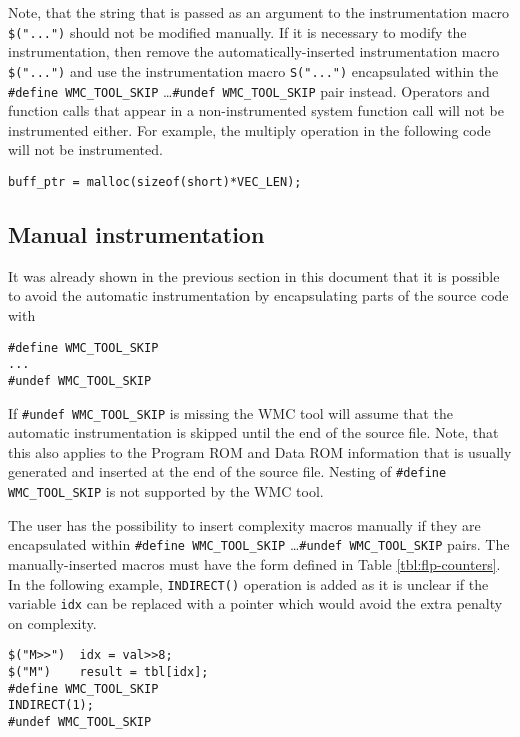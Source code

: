 Note, that the string that is passed as an argument to the instrumentation macro \verb|$("...")| should not be modified manually. If it is necessary to modify the instrumentation, then remove the automatically-inserted instrumentation macro \verb|$("...")| and use the instrumentation macro \verb|S("...")| encapsulated within the \verb|#define WMC_TOOL_SKIP| \ldots \verb|#undef WMC_TOOL_SKIP| pair instead. Operators and function calls that appear in a non-instrumented system function call will not be instrumented either. For example, the multiply operation in the following code will not be instrumented.

\begin{Verbatim}[fontsize=\small]
buff_ptr = malloc(sizeof(short)*VEC_LEN);
\end{Verbatim}

\subsection{Manual instrumentation}

It was already shown in the previous section in this document that it is possible to avoid the automatic instrumentation by encapsulating parts of the source code with

\begin{Verbatim}[fontsize=\small]
#define WMC_TOOL_SKIP
...
#undef WMC_TOOL_SKIP
\end{Verbatim}

If \verb|#undef WMC_TOOL_SKIP| is missing the WMC tool will assume that the automatic instrumentation is skipped until the end of the source file. Note, that this also applies to the Program ROM and Data ROM information that is usually generated and inserted at the end of the source file. Nesting of \verb|#define WMC_TOOL_SKIP| is not supported by the WMC tool.

The user has the possibility to insert complexity macros manually if they are encapsulated within \verb|#define WMC_TOOL_SKIP| \ldots \verb|#undef WMC_TOOL_SKIP| pairs. The manually-inserted macros must have the form defined in Table \ref{tbl:flp-counters}. In the following example, \verb|INDIRECT()| operation is added as it is unclear if the variable \verb|idx| can be replaced with a pointer which would avoid the extra penalty on complexity.

\begin{Verbatim}[fontsize=\small]
$("M>>")  idx = val>>8;
$("M")    result = tbl[idx];
#define WMC_TOOL_SKIP
INDIRECT(1);
#undef WMC_TOOL_SKIP
\end{Verbatim}


